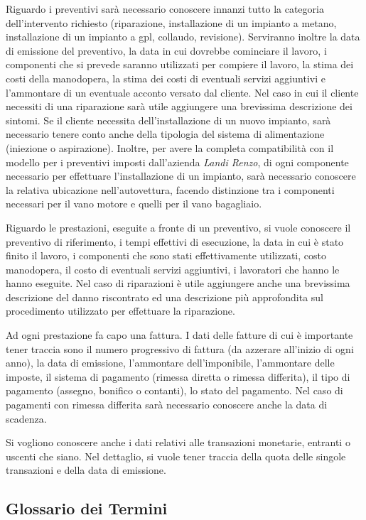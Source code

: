 		Riguardo i preventivi sarà necessario conoscere innanzi tutto la categoria dell'intervento richiesto (riparazione, installazione di un impianto a metano, installazione di un impianto a gpl, collaudo, revisione). Serviranno inoltre la data di emissione del preventivo, la data in cui dovrebbe cominciare il lavoro, i componenti che si prevede saranno utilizzati per compiere il lavoro, la stima dei costi della manodopera, la stima dei costi di eventuali servizi aggiuntivi e l'ammontare di un eventuale acconto versato dal cliente.
		Nel caso in cui il cliente necessiti di una riparazione sarà utile aggiungere una brevissima descrizione dei sintomi.
		Se il cliente necessita dell’installazione di un nuovo impianto, sarà necessario tenere conto anche della tipologia del sistema di alimentazione (iniezione o aspirazione). Inoltre, per avere la completa compatibilità con il modello per i preventivi imposti dall'azienda \emph{Landi Renzo}, di ogni componente necessario per effettuare l'installazione di un impianto, sarà necessario conoscere la relativa ubicazione nell'autovettura, facendo distinzione tra i componenti necessari per il vano motore e quelli per il vano bagagliaio.
		
		Riguardo le prestazioni, eseguite a fronte di un preventivo, si vuole conoscere il preventivo di riferimento, i tempi effettivi di esecuzione, la data in cui è stato finito il lavoro, i componenti che sono stati effettivamente utilizzati, costo manodopera, il costo di eventuali servizi aggiuntivi, i lavoratori che hanno le hanno eseguite.
		Nel caso di riparazioni è utile aggiungere anche una brevissima descrizione del danno riscontrato ed una descrizione più approfondita sul procedimento utilizzato per effettuare la riparazione.
		
		Ad ogni prestazione fa capo una fattura. I dati delle fatture di cui è importante tener traccia sono il numero progressivo di fattura (da azzerare all'inizio di ogni anno), la data di emissione, l'ammontare dell'imponibile, l'ammontare delle imposte, il sistema di pagamento (rimessa diretta o rimessa differita), il tipo di pagamento (assegno, bonifico o contanti), lo stato del pagamento. Nel caso di pagamenti con rimessa differita sarà necessario conoscere anche la data di scadenza.
		
		Si vogliono conoscere anche i dati relativi alle transazioni monetarie, entranti o uscenti che siano. Nel dettaglio, si vuole tener traccia della quota delle singole transazioni e della data di emissione.
		
	\subsection{Glossario dei Termini}
	
